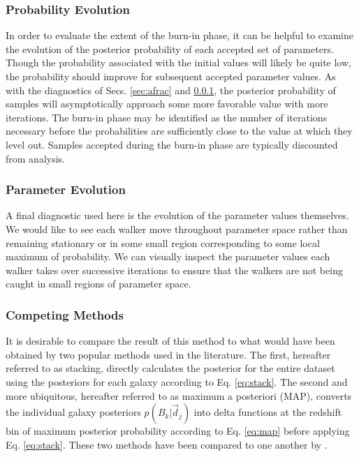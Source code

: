 \documentclass[preprint]{aastex}
\begin{document}
\subsubsection{Probability Evolution}
\label{sec:probs}

In order to evaluate the extent of the burn-in phase, it can be helpful to examine the evolution of the posterior probability of each accepted set of parameters.  Though the probability associated with the initial values will likely be quite low, the probability should improve for subsequent accepted parameter values.  As with the diagnostics of Secs. \ref{sec:afrac} and \ref{sec:probs}, the posterior probability of samples will asymptotically approach some more favorable value with more iterations.  The burn-in phase may be identified as the number of iterations necessary before the probabilities are sufficiently close to the value at which they level out.  Samples accepted during the burn-in phase are typically discounted from analysis.

\subsubsection{Parameter Evolution}
\label{sec:params}

A final diagnostic used here is the evolution of the parameter values themselves.  We would like to see each walker move throughout parameter space rather than remaining stationary or in some small region corresponding to some local maximum of probability.  We can visually inspect the parameter values each walker takes over successive iterations to ensure that the walkers are not being caught in small regions of parameter space.

\subsubsection{Competing Methods}
\label{sec:sheldon}

It is desirable to compare the result of this method to what would have been obtained by two popular methods used in the literature.   The first, hereafter referred to as stacking, directly calculates the posterior for the entire dataset using the posteriors for each galaxy according to Eq. \ref{eq:stack}.  \citep{lim08}  The second and more ubiquitous, hereafter referred to as maximum a posteriori (MAP), converts the individual galaxy posteriors $p(B_{k}|\vec{d}_{j})$ into delta functions at the redshift bin of maximum posterior probability according to Eq. \ref{eq:map} before applying Eq. \ref{eq:stack}.  These two methods have been compared to one another by \citet{hil11, ben12}.
\end{document}
